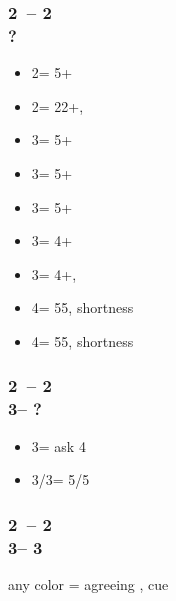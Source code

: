 \documentclass[12pt, a4paper]{article}
\begin{document}
\subsubsection*{2\clubs\ -- 2\hearts\\?}
\begin{itemize}
    \item 2\spades = 5+\spades
    \item 2\nt = 22+, \bal
    \item 3\clubs = 5+\clubs
    \item 3\diams = 5+\diams
    \item 3\hearts = 5+\hearts
    \item 3\spades = 4+\diams
    \item 3\nt = 4+\diams, \fonce
    \item 4\hearts = 55\minor, \hearts shortness
    \item 4\spades = 55\minor, \spades shortness
\end{itemize}

\subsubsection*{2\clubs\ -- 2\spades\\
                3\clubs -- ?}
\begin{itemize}
    \item 3\diams = ask 4\major
    \item 3\hearts/3\spades = 5\hearts/5\spades
\end{itemize}

\subsubsection*{2\clubs\ -- 2\spades\\
                3\clubs -- 3\hearts}
any color = agreeing \hearts, cue

\end{document}
